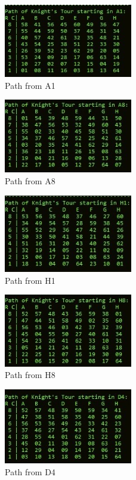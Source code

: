 \begin{figure}[h]
 	 \centering
   \includegraphics[width=0.5\textwidth]{a1.jpg}
  	\caption{Path from A1}
 	 \label{fig:a1}
	\end{figure}
\begin{figure}[h]
 	 \centering
   \includegraphics[width=0.5\textwidth]{a8.jpg}
  	\caption{Path from A8}
 	 \label{fig:a8}
	\end{figure}
\begin{figure}[h]
 	 \centering
   \includegraphics[width=0.5\textwidth]{H1.jpg}
  	\caption{Path from H1}
 	 \label{fig:H1}
	\end{figure}
\begin{figure}[h]
 	 \centering
   \includegraphics[width=0.5\textwidth]{h8.jpg}
  	\caption{Path from H8}
 	 \label{fig:h8}
	\end{figure}
	\begin{figure}[h]
 	 \centering
   \includegraphics[width=0.5\textwidth]{D41.jpg}
  	\caption{Path from D4}
 	 \label{fig:d4}
	\end{figure}
